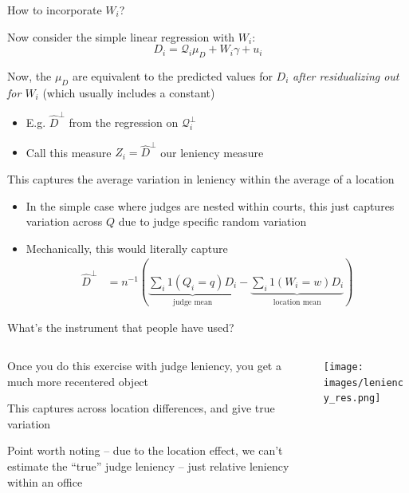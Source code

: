 \documentclass[notes,11pt, aspectratio=169]{beamer}
\newenvironment{wideitemize}{\itemize\addtolength{\itemsep}{10pt}}{\enditemize}
\begin{document}
\begin{frame}{How to incorporate $W_{i}$?}
  \begin{wideitemize}
  \item Now consider the simple linear regression with $W_{i}$:
    \begin{equation*}
      D_{i} = \mathcal{Q}_{i}\mu_{D} + W_{i}\gamma +  u_{i}
    \end{equation*}
  \item Now, the $\mu_{D}$ are equivalent to the predicted values for
    $D_{i}$ \emph{after residualizing out for $W_{i}$} (which usually
    includes a constant)
    \begin{itemize}
    \item E.g. $\hat{D}^{\perp}$ from the regression on $\mathcal{Q}_{i}^{\perp}$
    \item Call this measure $Z_{i} = \hat{D}^{\perp}$ our leniency measure
    \end{itemize}
  \item This captures the average variation in leniency within the average of a location
    \begin{itemize}
    \item In the simple case where judges are nested within courts,
      this just captures variation across $Q$ due to judge specific
      random variation
    \item Mechanically, this would literally capture
      \begin{align*}
        \hat{D}^{\perp} &= n^{-1}\left(\underbrace{\sum_{i}1(Q_{i} = q)D_{i}}_{\text{judge mean}} - \underbrace{\sum_{i}1(W_{i} = w)D_{i}}_{\text{location mean}}\right)
      \end{align*}
    \end{itemize}
  \end{wideitemize}
\end{frame}


\begin{frame}{What's the instrument that people have used?}
    \begin{columns}[onlytextwidth, T] %
      \begin{column}{.5\textwidth}
        \begin{wideitemize}
        \item Once you do this exercise with judge leniency, you get a
          much more recentered object
        \item This captures across location differences, and give true variation
        \item Point worth noting -- due to the location effect, we
          can't estimate the ``true'' judge leniency -- just relative
          leniency within an office
        \end{wideitemize}
      \end{column}%
      \hfill%
      \begin{column}{.5\textwidth}
        \texttt{[image: images/leniency\_res.png]}
      \end{column}%
    \end{columns}
  \end{frame}
\end{document}
